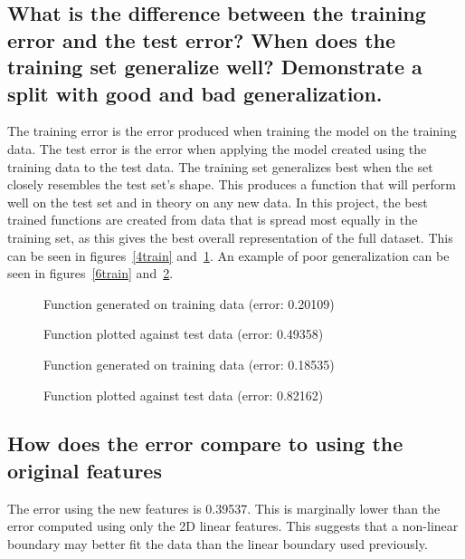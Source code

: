 \documentclass[titlepage]{scrartcl}
\begin{document}
\subsection{What is the difference between the training error and the test
    error? When does the training set generalize well? Demonstrate a split with
good and bad generalization.}
The training error is the error produced when training the model on the
training data. The test error is the error when applying the model created
using the training data to the test data.
The training set generalizes best when the set closely resembles the test
set's shape. This produces a function that will perform well on the test set
and in theory on any new data. In this project, the best trained functions are
created from data that is spread most equally in the training set, as this
gives the best overall representation of the full dataset. This can be seen in
figures~\ref{4train} and~\ref{4test}. An example of poor generalization can be
seen in figures~\ref{6train} and~\ref{6test}.

\begin{figure}
    \caption{Function generated on training data (error: 0.20109)}
    \label{4train}
    \caption{Function plotted against test data (error: 0.49358)}
    \label{4test}
\end{figure}
\begin{figure}
    \caption{Function generated on training data (error: 0.18535)}
    \label{6train}
    \caption{Function plotted against test data (error: 0.82162)}
    \label{6test}
\end{figure}

\subsection{How does the error compare to using the original features}
The error using the new features is 0.39537. This is marginally lower than the
error computed using only the 2D linear features. This suggests that a
non-linear boundary may better fit the data than the linear boundary used
previously.
\end{document}
